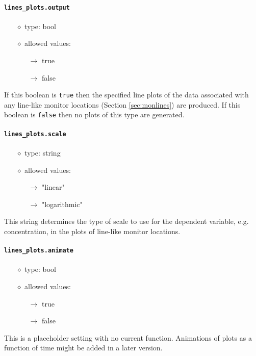 \documentclass[]{article}
\def\code#1{\texttt{#1}}
\begin{document}
\paragraph{\code{lines\_plots.output}}
\begin{itemize}
    \item[$\diamond$] type: bool 
    \item[$\diamond$] allowed values:
    \begin{itemize}
        \item[$\rightarrow$] true
        \item[$\rightarrow$] false
    \end{itemize}
\end{itemize}
If this boolean is \code{true} then the specified line plots of the data
associated with any line-like monitor locations (Section \ref{sec:monlines}) are
produced.  If this boolean is \code{false} then no plots of this type are
generated.

\paragraph{\code{lines\_plots.scale}}
\begin{itemize}
    \item[$\diamond$] type: string 
    \item[$\diamond$] allowed values:
    \begin{itemize}
        \item[$\rightarrow$] "linear"
        \item[$\rightarrow$] "logarithmic"
    \end{itemize}
\end{itemize}
This string determines the type of scale to use for the dependent variable, e.g.
concentration, in the plots of line-like monitor locations.

\paragraph{\code{lines\_plots.animate}}
\begin{itemize}
    \item[$\diamond$] type: bool 
    \item[$\diamond$] allowed values:
    \begin{itemize}
        \item[$\rightarrow$] true
        \item[$\rightarrow$] false
    \end{itemize}
\end{itemize}
This is a placeholder setting with no current function. Animations of plots as
a function of time might be added in a later version.
\end{document}
